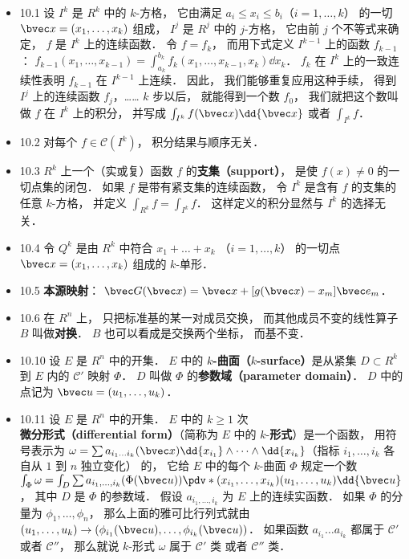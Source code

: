 \begin{itemize}
\item 10.1 设 $I^k$ 是 $R^k$ 中的 $k$-方格， 它由满足 $a_i\leqslant x_i \leqslant b_i$（$i=1,\dots,k$） 的一切 $\bvec x=(x_1,\dots,x_k)$ 组成， $I^j$ 是 $R^j$ 中的 $j$-方格， 它由前 $j$ 个不等式来确定， $f$ 是 $I^k$ 上的连续函数． 令 $f = f_k$， 而用下式定义 $I^{k-1}$ 上的函数 $f_{k-1}$： $f_{k-1}(x_1,\dots,x_{k-1}) = \int_{a_k}^{b_k} f_k(x_1,\dots,x_{k-1},x_k)\dd{x_k}$． $f_k$ 在 $I^k$ 上的一致连续性表明 $f_{k-1}$ 在 $I^{k-1}$ 上连续． 因此， 我们能够重复应用这种手续， 得到 $I^j$ 上的连续函数 $f_j$，…… $k$ 步以后， 就能得到一个数 $f_0$， 我们就把这个数叫做 $f$ 在 $I^k$ 上的积分， 并写成 $\int_{I^k} f(\bvec x)\dd{\bvec x}$ 或者 $\int_{I^k} f$．

\item 10.2 对每个 $f\in \mathscr C(I^k)$， 积分结果与顺序无关．

\item 10.3 $R^k$ 上一个（实或复）函数 $f$ 的\textbf{支集（support）}， 是使 $f(x)\ne 0$ 的一切点集的闭包． 如果 $f$ 是带有紧支集的连续函数， 令 $I^k$ 是含有 $f$ 的支集的任意 $k$-方格， 并定义 $\int_{R^k}f = \int_{I^k}f$． 这样定义的积分显然与 $I^k$ 的选择无关．

\item 10.4 令 $Q^k$ 是由 $R^k$ 中符合 $x_1+\dots+x_k$ （$i=1,\dots,k$） 的一切点 $\bvec x=(x_1,\dots,x_k)$ 组成的 $k$-单形． 

\item 10.5 \textbf{本源映射}： $\bvec G(\bvec x) = \bvec x + [g(\bvec x)-x_m]\bvec e_m$．

\item 10.6 在 $R^n$ 上， 只把标准基的某一对成员交换， 而其他成员不变的线性算子 $B$ 叫做\textbf{对换}． $B$ 也可以看成是交换两个坐标， 而基不变．

\item 10.10 设 $E$ 是 $R^n$ 中的开集． $E$ 中的 \textbf{$k$-曲面（$k$-surface）}是从紧集 $D\subset R^k$ 到 $E$ 内的 $\mathscr C'$ 映射 $\Phi$． $D$ 叫做 $\Phi$ 的\textbf{参数域（parameter domain）}． $D$ 中的点记为 $\bvec u = (u_1,\dots, u_k)$．

\item 10.11 设 $E$ 是 $R^n$ 中的开集． $E$ 中的 $k\geqslant 1$ 次\textbf{微分形式（differential form）}（简称为 $E$ 中的 $k$-\textbf{形式}）是一个函数， 用符号表示为 $\omega = \sum a_{i_1\dots i_k}(\bvec x)\dd{x_{i_1}} \wedge \dots \wedge \dd{x_{i_k}}$（指标 $i_1,\dots,i_k$ 各自从 $1$ 到 $n$ 独立变化） 的， 它给 $E$ 中的每个 $k$-曲面 $\Phi$ 规定一个数 $\int_\Phi \omega = \int_D \sum a_{i_1,\dots,i_k}(\Phi(\bvec u)) \pdv*{(x_{i_1},\dots,x_{i_k})}{(u_1,\dots,u_k)}\dd{\bvec u}$， 其中 $D$ 是 $\Phi$ 的参数域． 假设 $a_{i_1,\dots,i_k}$ 为 $E$ 上的连续实函数． 如果 $\Phi$ 的分量为 $\phi_1, \dots, \phi_n$， 那么上面的雅可比行列式就由 $(u_1,\dots,u_k)\to (\phi_{i_1}(\bvec u),\dots,\phi_{i_k}(\bvec u))$． 如果函数 $a_{i_1}\dots a_{i_k}$ 都属于 $\mathscr C'$ 或者 $\mathscr C''$， 那么就说 $k$-形式 $\omega$ 属于 $\mathscr C'$ 类 或者 $\mathscr C''$ 类．


\end{itemize}
